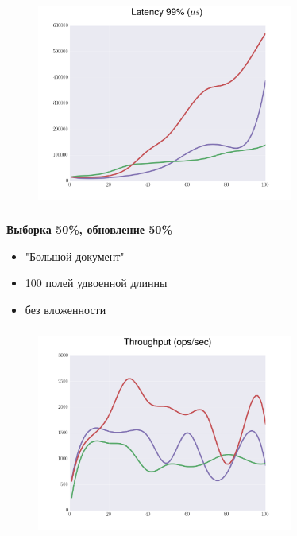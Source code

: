 \documentclass[18pt, compress, aspectratio=169]{beamer}
\begin{document}
\begin{frame}
    \frametitle{}
    \begin{center}
    \begin{figure}
        \includegraphics[width=0.75\textwidth,center]{benchmarks/workload_a_mongo_config/latency_99.png}
    \end{figure}
    \end{center}
\end{frame}

\begin{frame}
    \frametitle{}
    \begin{center}
        \textbf{Выборка 50\%, обновление 50\%}
        \begin{itemize}[label={}]
            \item "Большой документ"
            \item 100 полей удвоенной длинны
            \item без вложенности
        \end{itemize}
    \end{center}
\end{frame}

\begin{frame}
    \frametitle{}
    \begin{center}
    \begin{figure}
        \includegraphics[width=0.75\textwidth,center]{benchmarks/workload_a_large_document/throughput.png}
    \end{figure}
    \end{center}
\end{frame}
\end{document}
